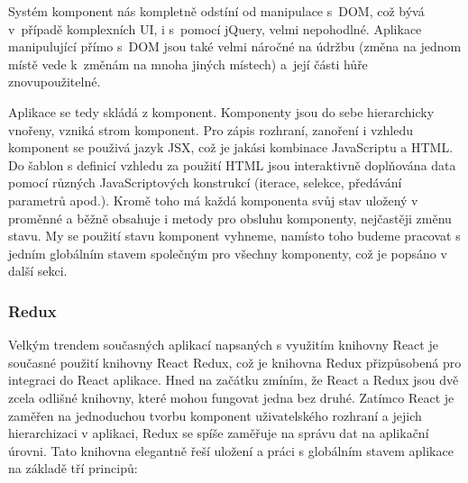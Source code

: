 Systém komponent nás kompletně odstíní od manipulace s~DOM, což bývá v~případě komplexních UI, i s~pomocí jQuery, velmi nepohodlné. Aplikace manipulující přímo s~DOM jsou také velmi náročné na údržbu (změna na jednom místě vede k~změnám na mnoha jiných místech) a~její části hůře znovupoužitelné.

Aplikace se tedy skládá z komponent. Komponenty jsou do sebe hierarchicky vnořeny, vzniká strom komponent. Pro zápis rozhraní, zanoření i vzhledu komponent se použivá jazyk JSX, což je jakási kombinace JavaScriptu a HTML. Do šablon s definicí vzhledu za použití HTML jsou interaktivně doplňována data pomocí různých JavaScriptových konstrukcí (iterace, selekce, předávání parametrů apod.). Kromě toho má každá komponenta svůj stav uložený v proměnné a běžně obsahuje i metody pro obsluhu komponenty, nejčastěji změnu stavu. My se použití stavu komponent vyhneme, namísto toho budeme pracovat s jedním globálním stavem společným pro všechny komponenty, což je popsáno v další sekci.


\subsubsection{Redux}
Velkým trendem současných aplikací napsaných s využitím knihovny React je současné použití knihovny React Redux, což je knihovna Redux přizpůsobená pro integraci do React aplikace. Hned na začátku zmíním, že React a Redux jsou dvě zcela odlišné knihovny, které mohou fungovat jedna bez druhé. Zatímco React je zaměřen na jednoduchou tvorbu komponent uživatelského rozhraní a jejich hierarchizaci v aplikaci, Redux se spíše zaměřuje na správu dat na aplikační úrovni. Tato knihovna elegantně řeší uložení a práci s globálním stavem aplikace na základě tří principů:

